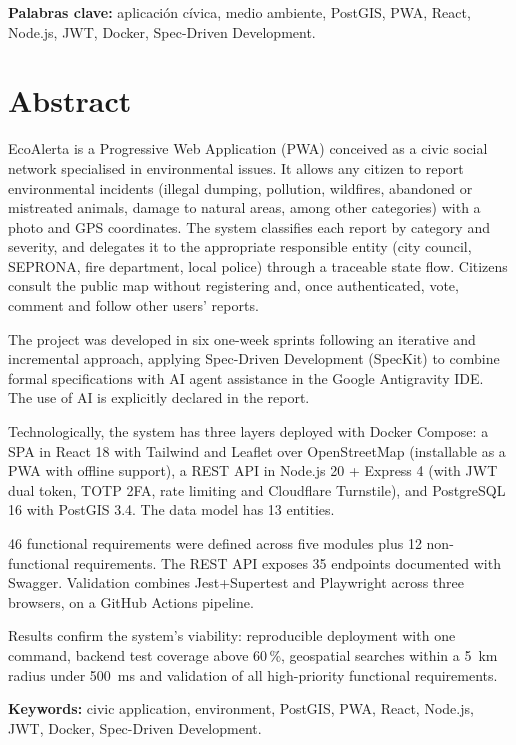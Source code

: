 \noindent\textbf{Palabras clave:} aplicación cívica, medio ambiente, PostGIS, PWA, React, Node.js, JWT, Docker, Spec-Driven Development.

\clearpage

\chapter*{Abstract}

EcoAlerta is a Progressive Web Application (PWA) conceived as a civic social network specialised in environmental issues. It allows any citizen to report environmental incidents (illegal dumping, pollution, wildfires, abandoned or mistreated animals, damage to natural areas, among other categories) with a photo and GPS coordinates. The system classifies each report by category and severity, and delegates it to the appropriate responsible entity (city council, SEPRONA, fire department, local police) through a traceable state flow. Citizens consult the public map without registering and, once authenticated, vote, comment and follow other users' reports.

The project was developed in six one-week sprints following an iterative and incremental approach, applying Spec-Driven Development (SpecKit) to combine formal specifications with AI agent assistance in the Google Antigravity IDE. The use of AI is explicitly declared in the report.

Technologically, the system has three layers deployed with Docker Compose: a SPA in React 18 with Tailwind and Leaflet over OpenStreetMap (installable as a PWA with offline support), a REST API in Node.js 20 + Express 4 (with JWT dual token, TOTP 2FA, rate limiting and Cloudflare Turnstile), and PostgreSQL 16 with PostGIS 3.4. The data model has 13 entities.

46 functional requirements were defined across five modules plus 12 non-functional requirements. The REST API exposes 35 endpoints documented with Swagger. Validation combines Jest+Supertest and Playwright across three browsers, on a GitHub Actions pipeline.

Results confirm the system's viability: reproducible deployment with one command, backend test coverage above 60\,\%, geospatial searches within a 5~km radius under 500~ms and validation of all high-priority functional requirements.

\noindent\textbf{Keywords:} civic application, environment, PostGIS, PWA, React, Node.js, JWT, Docker, Spec-Driven Development.

\clearpage
